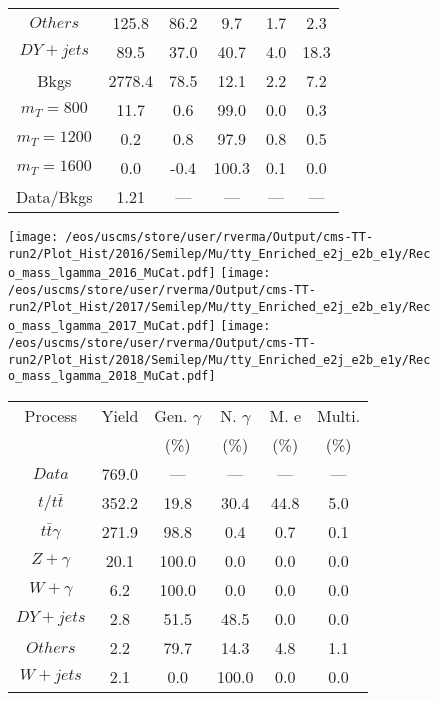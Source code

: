 \begin{figure}
\begin{minipage}[c]{0.32\textwidth}
{\begin{tabular}{cccccc}
$ Others $ &  125.8 &  86.2 &  9.7 &  1.7 &  2.3\\
$ DY+jets $ &  89.5 &  37.0 &  40.7 &  4.0 &  18.3\\
Bkgs &  2778.4 &  78.5 &  12.1 &  2.2 &  7.2\\
$ m_{T} = 800 $ &  11.7 &  0.6 &  99.0 &  0.0 &  0.3\\
$ m_{T} = 1200 $ &  0.2 &  0.8 &  97.9 &  0.8 &  0.5\\
$ m_{T} = 1600 $ &  0.0 &  -0.4 &  100.3 &  0.1 &  0.0\\
Data/Bkgs &  1.21 &  --- &  --- &  --- &  ---\\
\hline
\end{tabular}
}
\end{minipage}
\end{figure}

\begin{figure}
\centering
\texttt{[image: /eos/uscms/store/user/rverma/Output/cms-TT-run2/Plot\_Hist/2016/Semilep/Mu/tty\_Enriched\_e2j\_e2b\_e1y/Reco\_mass\_lgamma\_2016\_MuCat.pdf]}
\texttt{[image: /eos/uscms/store/user/rverma/Output/cms-TT-run2/Plot\_Hist/2017/Semilep/Mu/tty\_Enriched\_e2j\_e2b\_e1y/Reco\_mass\_lgamma\_2017\_MuCat.pdf]}
\texttt{[image: /eos/uscms/store/user/rverma/Output/cms-TT-run2/Plot\_Hist/2018/Semilep/Mu/tty\_Enriched\_e2j\_e2b\_e1y/Reco\_mass\_lgamma\_2018\_MuCat.pdf]}
\begin{minipage}[c]{0.32\textwidth}
\centering
\tiny{
\begin{tabular}{cccccc}
\hline
Process & Yield & Gen. $\gamma$ & N. $\gamma$ & M. e & Multi. \\
 &  & (\%) & (\%) & (\%) & (\%)  \\
\hline
                                                                      $ Data $ &  769.0 &  --- &  --- &  --- &  ---\\
$ t/t\bar{t} $ &  352.2 &  19.8 &  30.4 &  44.8 &  5.0\\
$ t\bar{t}\gamma $ &  271.9 &  98.8 &  0.4 &  0.7 &  0.1\\
$ Z+\gamma $ &  20.1 &  100.0 &  0.0 &  0.0 &  0.0\\
$ W+\gamma $ &  6.2 &  100.0 &  0.0 &  0.0 &  0.0\\
$ DY+jets $ &  2.8 &  51.5 &  48.5 &  0.0 &  0.0\\
$ Others $ &  2.2 &  79.7 &  14.3 &  4.8 &  1.1\\
$ W+jets $ &  2.1 &  0.0 &  100.0 &  0.0 &  0.0\\

\end{tabular}}
\end{minipage}
\end{figure}
